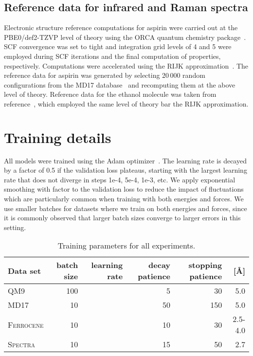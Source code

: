 \documentclass[reprint,
amsmath,amssymb,
 aip,jcp
]{revtex4-2}
\begin{document}
\subsection{Reference data for infrared and Raman spectra}

Electronic structure reference computations for aspirin were carried out at the PBE0/def2-TZVP\cite{adamo1999toward,Weigend2005PCCP} level of theory using the ORCA quantum chemistry package~\cite{Neese2012WCMS}.
SCF convergence was set to tight and integration grid levels of 4 and 5 were employed during SCF iterations and the final computation of properties, respectively.
Computations were accelerated using the RIJK approximation~\cite{weigend2002fully}.
The reference data for aspirin was generated by selecting 20\,000 random configurations from the MD17 database~\cite{chmiela2017machine} and recomputing them at the above level of theory.
Reference data for the ethanol molecule was taken from reference~\cite{gastegger2020machine}, which employed the same level of theory bar the RIJK approximation.


\section{Training details}
All models were trained using the Adam optimizer~\cite{kingma2014adam}.
The learning rate is decayed by a factor of 0.5 if the validation loss plateaus, starting with the largest learning rate that does not diverge in steps 1e-4, 5e-4, 1e-3, etc.
We apply exponential smoothing with factor  to the validation loss to reduce the impact of fluctuations which are particularly common when training with both energies and forces.
We use smaller batches for datasets where we train on both energies and forces, since it is commonly observed that larger batch sizes converge to larger errors in this setting.

\begin{table*}[htb]
\caption{Training parameters for all experiments.}
\label{tab:md17}
\begin{center}
\begin{scriptsize}
\begin{sc}
\begin{tabular}{lrrrrr}
\toprule
Data set & batch size & learning rate & decay patience & stopping patience &  [\AA]\\ 
\midrule
\textsc{QM9} & 100 &  & 5 & 30 & 5.0 \\
\textsc{MD17} & 10 &  & 50 & 150 & 5.0  \\
\textsc{Ferrocene} & 10 &  & 10 & 30 & 2.5-4.0 \\
\textsc{Spectra} & 10 &  & 15 & 50 & 2.7 \\
\bottomrule
\end{tabular}
\end{sc}
\end{scriptsize}
\end{center}
\vskip -0.1in
\end{table*}
\end{document}
